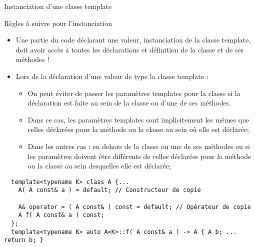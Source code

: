 \documentclass[compress,10pt,aspectratio=169]{beamer}
\begin{document}
\begin{frame}[fragile]{Instanciation d'une classe template}
\scriptsize\vspace*{-3mm}

\begin{block}{\small Règles à suivre pour l'instanciation}
\begin{itemize}
\item Une partie du code déclarant une valeur, instanciation de la classe template, 
      doit avoir accès à toutes les déclarations et définition de la classe 
      et de ses méthodes !
\item Lors de la déclaration d'une valeur de type la classe template :
\begin{itemize}
\scriptsize
\item On peut éviter de passer les paramètres templates pour la classe si la 
      déclaration est faite au sein de la classe ou d'une de ses méthodes.
\item Dans ce cas, les paramètres templates sont implicitement les mêmes que
      celles déclarées pour la méthode ou la classe au sein où elle est déclarée;
\item Dans les autres cas : en dehors de la classe ou une de ses méthodes ou si 
      les paramètres doivent être différents de celles déclarées pour la méthode
      ou la classe au sein desquelles elle est déclarée;
\end{itemize}
\end{itemize}
\end{block}
\begin{verbatim}
  template<typename K> class A {...
    A( A const& a ) = default; // Constructeur de copie
  
    A& operator = ( A const& ) const = default; // Opérateur de copie
    A f( A const& a ) const;
  };
  template<typename K> auto A<K>::f( A const& a ) -> A { A b; ... return b; }
\end{verbatim}
\end{frame}
\end{document}

